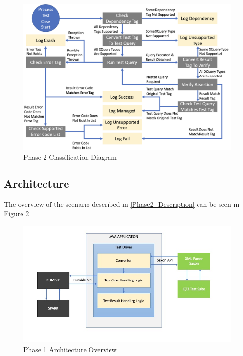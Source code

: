 \begin{figure}[h!]
	\vspace*{-3mm}
	\includegraphics[width=\linewidth]{error_code.png}
	\caption{Phase 2 Classification Diagram}
	\vspace*{-5mm}
	\label{fig:Phase2_ErrorCodes}
\end{figure}

\subsection{Architecture}
The overview of the scenario described in \ref{Phase2_Description} can be seen in Figure \ref{fig:Phase2_Architecture}
\begin{figure}[h!]
	\vspace*{-5mm}
	\includegraphics[width=\linewidth]{architecture_diagram_phase_2.jpg}
	\vspace*{-15mm}
	\caption{Phase 1 Architecture Overview}
	\label{fig:Phase2_Architecture}
\end{figure}

